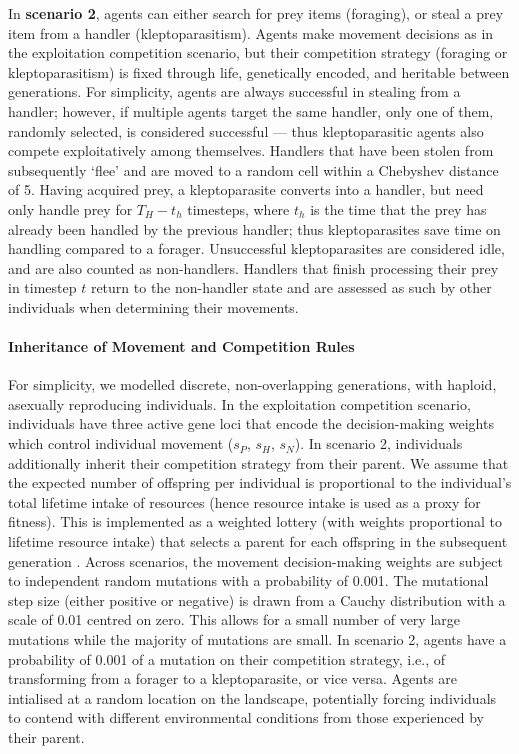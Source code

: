     In \textbf{scenario 2}, agents can either search for prey items (foraging), or steal a prey item from a handler (kleptoparasitism).
    Agents make movement decisions as in the exploitation competition scenario, but their competition strategy (foraging or kleptoparasitism) is fixed through life, genetically encoded, and heritable between generations.
    For simplicity, agents are always successful in stealing from a handler; however, if multiple agents target the same handler, only one of them, randomly selected, is considered successful --- thus kleptoparasitic agents also compete exploitatively among themselves.
    Handlers that have been stolen from subsequently `flee' and are moved to a random cell within a Chebyshev distance of 5.
    Having acquired prey, a kleptoparasite converts into a handler, but need only handle prey for $T_H - t_h$ timesteps, where $t_h$ is the time that the prey has already been handled by the previous handler; thus kleptoparasites save time on handling compared to a forager.
    Unsuccessful kleptoparasites are considered idle, and are also counted as non-handlers.
    Handlers that finish processing their prey in timestep $t$ return to the non-handler state and are assessed as such by other individuals when determining their movements.
    
    \paragraph*{Inheritance of Movement and Competition Rules}
    
    For simplicity, we modelled discrete, non-overlapping generations, with haploid, asexually reproducing individuals.
    In the exploitation competition scenario, individuals have three active gene loci that encode the decision-making weights which control individual movement ($s_P$, $s_H$, $s_N$). 
    In scenario 2, individuals additionally inherit their competition strategy from their parent.
    We assume that the expected number of offspring per individual is proportional to the individual's total lifetime intake of resources (hence resource intake is used as a proxy for fitness). 
    This is implemented as a weighted lottery (with weights proportional to lifetime resource intake) that selects a parent for each offspring in the subsequent generation \citep[see prior implementation in][]{netz2021}.
    Across scenarios, the movement decision-making weights are subject to independent random mutations with a probability of 0.001.
    The mutational step size (either positive or negative) is drawn from a Cauchy distribution with a scale of 0.01 centred on zero.
    This allows for a small number of very large mutations while the majority of mutations are small.
    In scenario 2, agents have a probability of 0.001 of a mutation on their competition strategy, i.e., of transforming from a forager to a kleptoparasite, or vice versa.
    Agents are intialised at a random location on the landscape, potentially forcing individuals to contend with different environmental conditions from those experienced by their parent.
    

